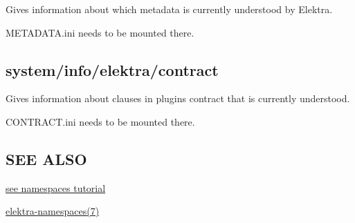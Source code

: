 Gives information about which metadata is currently understood by Elektra.

{\ttfamily M\+E\+T\+A\+D\+A\+T\+A.\+ini} needs to be mounted there.

\subsection*{system/info/elektra/contract}

Gives information about clauses in plugin\textquotesingle{}s contract that is currently understood.

{\ttfamily C\+O\+N\+T\+R\+A\+C\+T.\+ini} needs to be mounted there.

\subsection*{S\+EE A\+L\+SO}


\begin{DoxyItemize}
\item \hyperlink{doc_tutorials_namespaces_md}{see namespaces tutorial}
\item \hyperlink{doc_help_elektra-namespaces_md}{elektra-\/namespaces(7)} 
\end{DoxyItemize}